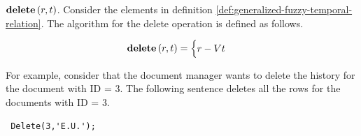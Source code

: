 \begin{definition}
 \emph{$\mbox{\textbf{delete}} \left(r, t \right) $}.
Consider the elements in definition \ref{def:generalized-fuzzy-temporal-relation}. The algorithm for the delete operation is defined as follows.
\end{definition}


\begin{align}
\label{eq:delete-fuzzy-temporal}
\mbox{\textbf{delete}} \left(r, t\right) =
\begin{cases}
\nonumber
r - Vt
\end{cases} 	
\end{align}

For example, consider that the document manager wants to delete the history for the document with ID = 3. The following sentence deletes all the rows for the documents with ID = 3.

\begin{verbatim}
 Delete(3,'E.U.');
\end{verbatim}


% 
% 
% 
